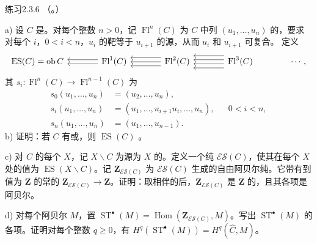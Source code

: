 \begin{SGAresult}{练习}{2.3.6}
（。）

a) 设 $C$ 是。对每个整数 $n>0$，记 $\operatorname{Fl}^n(C)$ 为 $C$ 中列 $(u_1,\ldots,u_n)$ 的，要求对每个 $i$，$0<i<n$，$u_i$ 的靶等于 $u_{i+1}$ 的源，从而 $u_i$ 和 $u_{i+1}$ 可复合。
定义
\[
\begin{tikzcd}[column sep=large]
 \operatorname{ES}(C)=\operatorname{ob}C&
 \operatorname{Fl}^1(C)\arrow[l,shift left=1]\arrow[l,shift right=1]&
 \operatorname{Fl}^2(C)\arrow[l,shift left=2]\arrow[l]\arrow[l,shift right=2]&
 \operatorname{Fl}^3(C)\arrow[l,shift left=3]\arrow[l,shift left=1]\arrow[l,shift right=1]\arrow[l,shift right=3]&\cdots,
\end{tikzcd}
\]
其 $s_i:\operatorname{Fl}^n(C)\to\operatorname{Fl}^{n-1}(C)$ 为
\[
\begin{aligned}
 s_0(u_1,\ldots,u_n)&=(u_2,\ldots,u_n),\\
 s_i(u_1,\ldots,u_n)&=(u_1,\ldots,u_{i+1}u_i,\ldots,u_n),&&0<i<n,\\
 s_n(u_1,\ldots,u_n)&=(u_1,\ldots,u_{n-1}).
\end{aligned}
\]
b) 证明：若 $C$ 有或，则 $\operatorname{ES}(C)$ 。

c) 对 $C$ 的每个 $X$，记 $X\backslash C$ 为源为 $X$ 的。定义一个纯 $\mathscr{ES}(C)$，使其在每个 $X$ 处的值为 $\operatorname{ES}(X\backslash C)$。记 $\mathbf Z_{\mathscr{ES}(C)}$ 为 $\mathscr{ES}(C)$ 生成的自由阿贝尔纯。它带有到值为 $\mathbf Z$ 的常的 $\mathbf Z_{\mathscr{ES}(C)}\to\mathbf Z$。证明：取相伴的后，$\mathbf Z_{\mathscr{ES}(C)}$ 是 $\mathbf Z$ 的，且其各项是阿贝尔。

d) 对每个阿贝尔 $M$，置 $\operatorname{ST}^\bullet(M)=\operatorname{Hom}(\mathbf Z_{\mathscr{ES}(C)},M)$。写出 $\operatorname{ST}^\bullet(M)$ 的各项。证明对每个整数 $q\geq0$，有
$H^q(\operatorname{ST}^\bullet(M))=H^q(\widehat C,M)$。


\end{SGAresult}
